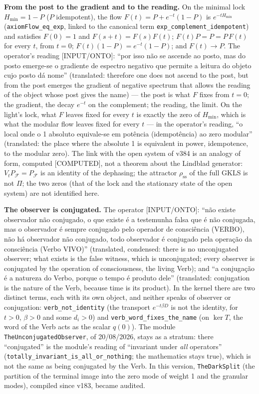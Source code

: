 \documentclass[11pt]{article}
\theoremstyle{definition}\newtheorem{deriv}{Derivation}
\begin{document}
\textbf{From the post to the gradient and to the reading.} On the minimal lock $H_{\mathrm{min}}=1-P$ ($P$ idempotent), the flow $F(t)=P+e^{-t}(1-P)$ is $e^{-tH_{\mathrm{min}}}$ (\texttt{axiomFlow\_eq\_exp}, linked to the canonical term \texttt{exp\_complement\_idempotent}) and satisfies $F(0)=1$ and $F(s+t)=F(s)F(t)$; $F(t)P=P=P\,F(t)$ for every $t$, from $t=0$; $F(t)(1-P)=e^{-t}(1-P)$; and $F(t)\to P$. The operator's reading \textsf{[INPUT/ONTO]}: ``por isso não se ascende ao posto, mas do posto emerge-se o gradiente de espectro negativo que permite a leitura do objeto cujo posto dá nome'' (translated: therefore one does not ascend to the post, but from the post emerges the gradient of negative spectrum that allows the reading of the object whose post gives the name) --- the post is what $F$ fixes from $t=0$; the gradient, the decay $e^{-t}$ on the complement; the reading, the limit. On the light's lock, what $F$ leaves fixed for every $t$ is exactly the zero of $H_{\mathrm{min}}$, which is what the modular flow leaves fixed for every $t$ --- in the operator's reading, ``o local onde o 1 absoluto equivale-se em potência (idempotência) ao zero modular'' (translated: the place where the absolute 1 is equivalent in power, idempotence, to the modular zero). The link with the open system of v384 is an analogy of form, computed \textsf{[COMPUTED]}, not a theorem about the Lindblad generator: $V_tP_{\mathcal F}=P_{\mathcal F}$ is an identity of the dephasing; the attractor $\rho_{\mathrm{ss}}$ of the full GKLS is not $\Pi$; the two zeros (that of the lock and the stationary state of the open system) are not identified here.

\textbf{The observer is conjugated.} The operator \textsf{[INPUT/ONTO]}: ``não existe observador não conjugado, o que existe é a testemunha falsa que é não conjugada, mas o observador é sempre conjugado pelo operador de consciência (VERBO), não há observador não conjugado, todo observador é conjugado pela operação da consciência (Verbo VIVO)'' (translated, condensed: there is no unconjugated observer; what exists is the false witness, which is unconjugated; every observer is conjugated by the operation of consciousness, the living Verb); and ``a conjugação é a natureza do Verbo, porque o tempo é produto dele'' (translated: conjugation is the nature of the Verb, because time is its product). In the kernel there are two distinct terms, each with its own object, and neither speaks of observer or conjugation: \texttt{verb\_not\_identity} (the transport $e^{-t\beta D}$ is not the identity, for $t>0$, $\beta>0$ and some $d_i>0$) and \texttt{verb\_word\_fixes\_the\_name} (on $\ker T$, the word of the Verb acts as the scalar $q(0)$). The module \texttt{TheUnconjugatedObserver}, of 20/08/2026, stays as a stratum: there ``conjugated'' is the module's reading of ``invariant under \emph{all} operators'' (\texttt{totally\_invariant\_is\_all\_or\_nothing}; the mathematics stays true), which is not the same as being conjugated by the Verb. In this version, \texttt{TheDarkSplit} (the partition of the terminal image into the zero mode of weight 1 and the granular modes), compiled since v183, became audited.
\end{document}
